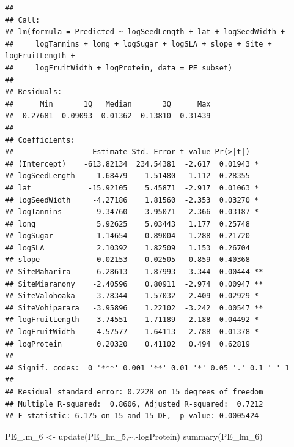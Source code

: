 \documentclass[
  12pt,
]{article}
\newenvironment{Shaded}{\begin{snugshade}}{\end{snugshade}}
\newcommand{\FunctionTok}[1]{\textcolor[rgb]{0.00,0.00,0.00}{#1}}
\newcommand{\NormalTok}[1]{#1}
\newcommand{\OtherTok}[1]{\textcolor[rgb]{0.56,0.35,0.01}{#1}}
\newcommand{\SpecialCharTok}[1]{\textcolor[rgb]{0.00,0.00,0.00}{#1}}
\begin{document}
\begin{verbatim}
## 
## Call:
## lm(formula = Predicted ~ logSeedLength + lat + logSeedWidth + 
##     logTannins + long + logSugar + logSLA + slope + Site + logFruitLength + 
##     logFruitWidth + logProtein, data = PE_subset)
## 
## Residuals:
##      Min       1Q   Median       3Q      Max 
## -0.27681 -0.09093 -0.01362  0.13810  0.31439 
## 
## Coefficients:
##                  Estimate Std. Error t value Pr(>|t|)   
## (Intercept)    -613.82134  234.54381  -2.617  0.01943 * 
## logSeedLength     1.68479    1.51480   1.112  0.28355   
## lat             -15.92105    5.45871  -2.917  0.01063 * 
## logSeedWidth     -4.27186    1.81560  -2.353  0.03270 * 
## logTannins        9.34760    3.95071   2.366  0.03187 * 
## long              5.92625    5.03443   1.177  0.25748   
## logSugar         -1.14654    0.89004  -1.288  0.21720   
## logSLA            2.10392    1.82509   1.153  0.26704   
## slope            -0.02153    0.02505  -0.859  0.40368   
## SiteMaharira     -6.28613    1.87993  -3.344  0.00444 **
## SiteMiaranony    -2.40596    0.80911  -2.974  0.00947 **
## SiteValohoaka    -3.78344    1.57032  -2.409  0.02929 * 
## SiteVohiparara   -3.95896    1.22102  -3.242  0.00547 **
## logFruitLength   -3.74551    1.71189  -2.188  0.04492 * 
## logFruitWidth     4.57577    1.64113   2.788  0.01378 * 
## logProtein        0.20320    0.41102   0.494  0.62819   
## ---
## Signif. codes:  0 '***' 0.001 '**' 0.01 '*' 0.05 '.' 0.1 ' ' 1
## 
## Residual standard error: 0.2228 on 15 degrees of freedom
## Multiple R-squared:  0.8606, Adjusted R-squared:  0.7212 
## F-statistic: 6.175 on 15 and 15 DF,  p-value: 0.0005424
\end{verbatim}

\begin{Shaded}
\begin{Highlighting}[]
\NormalTok{PE\_lm\_6 }\OtherTok{\textless{}{-}} \FunctionTok{update}\NormalTok{(PE\_lm\_5,}\SpecialCharTok{\textasciitilde{}}\NormalTok{.}\SpecialCharTok{{-}}\NormalTok{logProtein)}
\FunctionTok{summary}\NormalTok{(PE\_lm\_6)}
\end{Highlighting}
\end{Shaded}
\end{document}
